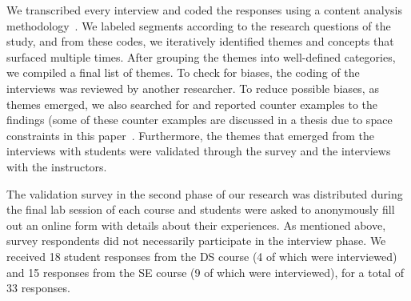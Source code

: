We transcribed every interview and coded the responses using a content analysis methodology~\cite{charmaz2006constructing}.
We labeled segments according to the research questions of the study, and from these codes, we iteratively identified themes and concepts that surfaced multiple times. After grouping the themes into well-defined categories, we compiled a final list of themes. To check for biases, the coding of the interviews was reviewed by another researcher. To reduce possible biases, as themes emerged, we also searched for and reported counter examples to the findings (some of these counter examples are discussed in a thesis due to space constraints in this paper~\cite{feliciano2015towards}. Furthermore, the themes that emerged from the interviews with students were validated through the survey and the interviews with the instructors.

The validation survey in the second phase of our research was distributed during the final lab session of each course and students were asked to anonymously fill out an online form with details about their experiences. As mentioned above, survey respondents did not necessarily participate in the interview phase. We received 18 student responses from the DS course (4 of which were interviewed) and 15 responses from the SE course (9 of which were interviewed), for a total of 33 responses.  